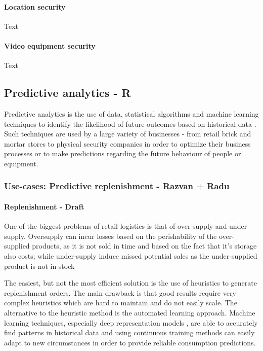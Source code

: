 \documentclass{article}
\begin{document}
        \paragraph{Location security}
        Text
        \paragraph{Video equipment security}
        Text


\subsection{Predictive analytics - R}
Predictive analytics is the use of data, statistical algorithms and machine learning techniques to identify the likelihood of future outcomes based on historical data \cite{klimberg2016fundamentals}. Such techniques are used by a large variety of businesses - from retail brick and mortar stores to physical security companies in order to optimize their business processes or to make predictions regarding the future behaviour of people or equipment.

\subsubsection{Use-cases: Predictive replenishment - Razvan + Radu}

\paragraph{Replenishment - Draft} One of the biggest problems of retail logistics is that of over-supply and under-supply. Oversupply can incur losses based on the perishability of the over-supplied products, as it is not sold in time and based on the fact that it's storage also costs; while under-supply induce missed potential sales as the under-supplied product is not in stock

The easiest, but not the most efficient solution is the use of heuristics \cite{stefanovic2015collaborative} to generate replenishment orders. The main drawback is that good results require very complex heuristics which are hard to maintain and do not easily scale. The alternative to the heuristic method is the automated learning approach. Machine learning techniques, especially deep representation models \cite{kilimci2019improved}, are able to accurately find patterns in historical data and using continuous training methods can easily adapt to new circumstances in order to provide reliable consumption predictions.
\end{document}
